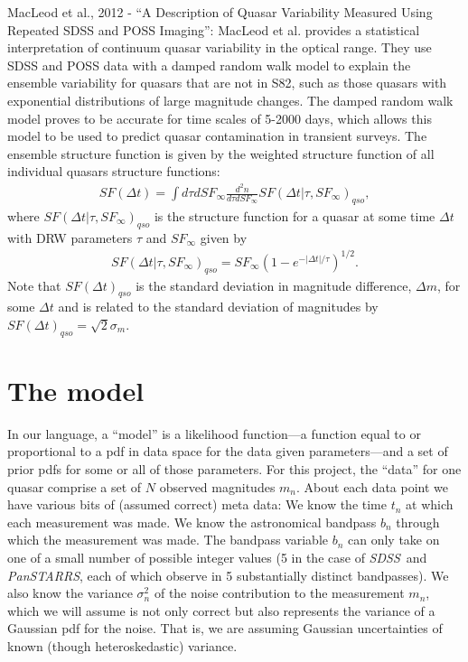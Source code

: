 \documentclass[letterpaper,12pt,preprint]{aastex}
\newcommand{\project}[1]{\textsl{#1}}
\newcommand{\sdss}{\project{SDSS}}
\newcommand{\panstarrs}{\project{PanSTARRS}}
\begin{document}
MacLeod et al., 2012 - ``A Description of Quasar Variability Measured
Using Repeated SDSS and POSS Imaging'': MacLeod et al. provides a
statistical interpretation of continuum quasar variability in the
optical range. They use SDSS and POSS data with a damped random walk
model to explain the ensemble variability for quasars that are not in
S82, such as those quasars with exponential distributions of large
magnitude changes. The damped random walk model proves to be accurate
for time scales of 5-2000 days, which allows this model to be used to
predict quasar contamination in transient surveys. The ensemble
structure function is given by the weighted structure function of all
individual quasars structure functions:
\begin{eqnarray}
SF(\Delta t)= \int d\tau dSF_{\infty} \frac{d^2n}{ d\tau dSF_{\infty}}
SF(\Delta t| \tau,SF_{\infty})_{qso},
\end{eqnarray} 
where $ SF(\Delta t| \tau,SF_{\infty})_{qso}$ is the structure
function for a quasar at some time $\Delta t$ with DRW parameters
$\tau$ and $SF_{\infty}$ given by
\begin{eqnarray}
 SF(\Delta t| \tau,SF_{\infty})_{qso}=SF_{\infty}(1-e^{-|\Delta
   t|/\tau})^{1/2}.  
\end{eqnarray}
Note that $SF(\Delta t)_{qso}$ is the standard
 deviation in magnitude difference, $\Delta m$, for some $\Delta t$ and is related
 to the standard deviation of magnitudes by $SF(\Delta
 t)_{qso}=\sqrt{2}\sigma_m$.



\section{The model}

In our language, a ``model'' is a likelihood function---a function
equal to or proportional to a pdf in data space for the data given
parameters---and a set of prior pdfs for some or all of those
parameters.  For this project, the ``data'' for one quasar comprise a
set of $N$ observed magnitudes $m_n$.  About each data point we have
various bits of (assumed correct) meta data: We know the time $t_n$ at
which each measurement was made.  We know the astronomical bandpass
$b_n$ through which the measurement was made.  The bandpass variable
$b_n$ can only take on one of a small number of possible integer
values (5 in the case of \sdss\ and \panstarrs, each of which observe
in 5 substantially distinct bandpasses).  We also know the variance
$\sigma_n^2$ of the noise contribution to the measurement $m_n$, which
we will assume is not only correct but also represents the variance of
a Gaussian pdf for the noise.  That is, we are assuming Gaussian
uncertainties of known (though heteroskedastic) variance.
\end{document}

